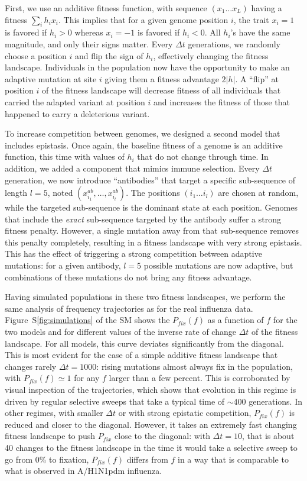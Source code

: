 \documentclass[reprint,amsmath,amssymb,superscriptaddress,showpacs,rmp]{revtex4-1}
\newcommand{\sref}[1]{S\ref{#1}}
\begin{document}
First, we use an additive fitness function, with sequence $(x_1\ldots x_L)$ having a fitness $\sum_i h_i x_i$. 
This implies that for a given genome position $i$, the trait $x_i = 1$ is favored if $h_i>0$ whereas  $x_i = -1$ is favored if $h_i<0$. 
All $h_i$'s have the same magnitude, and only their signs matter. 
Every $\Delta t$ generations, we randomly choose a position $i$ and flip the sign of $h_i$, effectively changing the fitness landscape. 
Individuals in the population now have the opportunity to make an adaptive mutation at site $i$ giving them a fitness advantage $2\vert h \vert$. 
A ``flip'' at position $i$ of the fitness landscape will decrease fitness of all individuals that carried the adapted variant at position $i$ and increases the fitness of those that happened to carry a deleterious variant. 

To increase competition between genomes, we designed a second model that includes epistasis. 
Once again, the baseline fitness of a genome is an additive function, this time with values of $h_i$ that do not change through time. 
In addition, we added a component that mimics immune selection.
Every $\Delta t$ generation, we now introduce ``antibodies'' that target a specific sub-sequence of length $l=5$, noted $(x^{ab}_{i_1}, \ldots, x^{ab}_{i_l})$. 
The positions $(i_1\ldots i_l)$ are chosen at random, while the targeted sub-sequence is the dominant state at each position.
Genomes that include the \emph{exact} sub-sequence targeted by the antibody suffer a strong fitness penalty. However, a single mutation away from that sub-sequence removes this penalty completely, resulting in a fitness landscape with very strong epistasis. 
This has the effect of triggering a strong competition between adaptive mutations: for a given antibody, $l=5$ possible mutations are now adaptive, but combinations of these mutations do not bring any fitness advantage.

Having simulated populations in these two fitness landscapes, we perform the same analysis of frequency trajectories as for the real influenza data. 
Figure~\sref{fig:simulations} of the SM shows the $P_{fix}(f)$ as a function of $f$ for the two models and for different values of the inverse rate of change $\Delta t$ of the fitness landscape. 
For all models, this curve deviates significantly from the diagonal. 
This is most evident for the case of a simple additive fitness landscape that changes rarely $\Delta t=1000$: rising mutations almost always fix in the population, with $P_{fix}(f)\simeq 1$ for any $f$ larger than a few percent. 
This is corroborated by visual inspection of the trajectories, which shows that evolution in this regime is driven by regular selective sweeps that take a typical time of $\sim 400$ generations. 
In other regimes, with smaller $\Delta t$ or with strong epistatic competition, $P_{fix}(f)$ is reduced and closer to the diagonal. 
However, it takes an extremely fast changing fitness landscape to push $P_{fix}$ close to the diagonal: with $\Delta t=10$, that is about 40 changes to the fitness landscape in the time it would take a selective sweep to go from 0\% to fixation, $P_{fix}(f)$ differs from $f$ in a way that is comparable to what is observed in A/H1N1pdm influenza.
\end{document}
